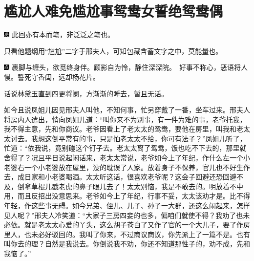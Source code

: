 

\chapter{尴尬人难免尴尬事\hspace{.5em}鸳鸯女誓绝鸳鸯偶}

{\includegraphics[width=3mm]{../Images/00004}  \kaishu 此回亦有本而笔，非泛泛之笔也。}

{只看他题纲用``尴尬''二字于邢夫人，可知包藏含蓄文字之中，莫能量也。}

{\includegraphics[width=3mm]{../Images/00005}  \kaishu 裹脚与缠头，欲觅终身伴。顾影自为怜，静住深深院。　好事不称心，恶语将人慢。誓死守香闺，远却杨花片。}

话说林黛玉直到四更将阑，方渐渐的睡去，暂且无话。

如今且说凤姐儿因见邢夫人叫他，不知何事，忙另穿戴了一番，坐车过来。邢夫人将房内人遣出，悄向凤姐儿道：``叫你来不为别事，有一件为难的事，老爷托我，我不得主意，先和你商议。老爷因看上了老太太的鸳鸯，要他在房里，叫我和老太太讨去。我想这倒平常有的事，只是怕老太太不给，你可有法子？''凤姐儿听了，忙道：``依我说，竟别碰这个钉子去。老太太离了鸳鸯，饭也吃不下去的，那里就舍得了？况且平日说起闲话来，老太太常说，老爷如今上了年纪，作什么左一个小老婆右一个小老婆放在屋里，没的耽误了人家。放着身子不保养，官儿也不好生作去，成日家和小老婆喝酒。太太听这话，很喜欢老爷呢？这会子回避还恐回避不及，倒拿草棍儿戳老虎的鼻子眼儿去了！太太别恼，我是不敢去的。明放着不中用，而且反招出没意思来。老爷如今上了年纪，行事不妥，太太该劝才是。比不得年轻，作这些事无碍。如今兄弟、侄儿、儿子、孙子一大群，还这么闹起来，怎样见人呢？''邢夫人冷笑道：``大家子三房四妾的也多，偏咱们就使不得？我劝了也未必依。就是老太太心爱的丫头，这么胡子苍白了又作了官的一个大儿子，要了作房里人，也未必好驳回的。我叫了你来，不过商议商议，你先派上了一篇不是。也有叫你去的理？自然是我说去。你倒说我不劝，你还不知道那性子的，劝不成，先和我恼了。''

